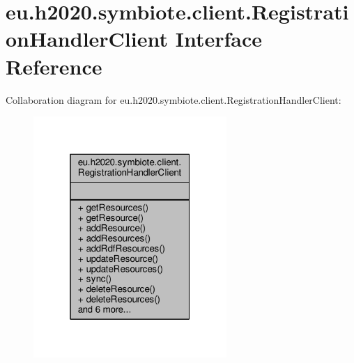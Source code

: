 \hypertarget{interfaceeu_1_1h2020_1_1symbiote_1_1client_1_1RegistrationHandlerClient}{}\section{eu.\+h2020.\+symbiote.\+client.\+Registration\+Handler\+Client Interface Reference}
\label{interfaceeu_1_1h2020_1_1symbiote_1_1client_1_1RegistrationHandlerClient}


Collaboration diagram for eu.\+h2020.\+symbiote.\+client.\+Registration\+Handler\+Client\+:
\nopagebreak
\begin{figure}[H]
\begin{center}
\leavevmode
\includegraphics[width=208pt]{interfaceeu_1_1h2020_1_1symbiote_1_1client_1_1RegistrationHandlerClient__coll__graph}
\end{center}
\end{figure}
